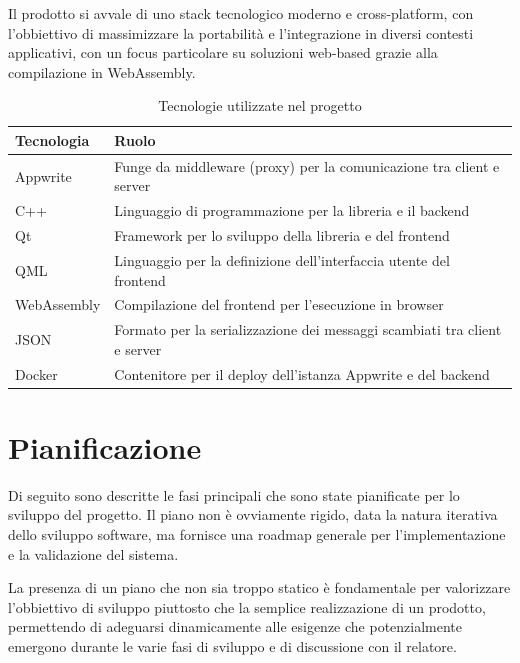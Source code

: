 \documentclass[a4paper, 11pt, twoside]{report}
\begin{document}
Il prodotto si avvale di uno stack tecnologico moderno e cross-platform, con l'obbiettivo di massimizzare la portabilità 
e l'integrazione in diversi contesti applicativi, con un focus particolare su soluzioni web-based grazie alla 
compilazione in WebAssembly.

\begin{table}[h]
\centering
\begin{tabular}{@{}ll@{}}
\toprule
\textbf{Tecnologia} & \textbf{Ruolo}                                                            \\ \midrule
Appwrite            & Funge da middleware (proxy) per la comunicazione tra client e server      \\
C++                 & Linguaggio di programmazione per la libreria e il backend                 \\
Qt                  & Framework per lo sviluppo della libreria e del frontend                   \\
\gls{QML}           & Linguaggio per la definizione dell'interfaccia utente del frontend        \\
WebAssembly         & Compilazione del frontend per l'esecuzione in browser                     \\
JSON                & Formato per la serializzazione dei messaggi scambiati tra client e server \\
Docker              & Contenitore per il deploy dell'istanza Appwrite e del backend             \\
\bottomrule
\end{tabular}
\caption{Tecnologie utilizzate nel progetto}
\end{table}

\section{Pianificazione}

Di seguito sono descritte le fasi principali che sono state pianificate per lo sviluppo del progetto. Il piano non è
ovviamente rigido, data la natura iterativa dello sviluppo software, ma fornisce una roadmap generale per l'implementazione
e la validazione del sistema.

La presenza di un piano che non sia troppo statico è fondamentale per valorizzare l'obbiettivo di sviluppo piuttosto
che la semplice realizzazione di un prodotto, permettendo di adeguarsi dinamicamente alle esigenze che potenzialmente
emergono durante le varie fasi di sviluppo e di discussione con il relatore.
\end{document}
